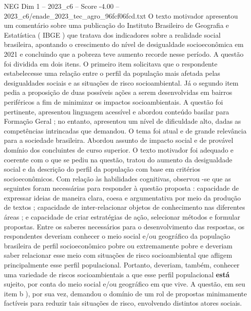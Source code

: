 \begin{textsample}{NEG Dim 1 – 2023\_c6 – Score -4.00 – 2023\_c6/enade\_2023\_tec\_agro\_96fcf06fcd.txt}
O texto motivador apresentou um comentário sobre uma publicação do Instituto Brasileiro de Geografia e Estatística ( IBGE ) que tratava dos indicadores sobre a realidade social brasileira, apontando o crescimento do nível de desigualdade socioeconômica em 2021 e concluindo que a pobreza teve aumento recorde nesse período.
A questão foi dividida em dois itens.
O primeiro item solicitava que o respondente estabelecesse uma relação entre o perfil da população mais afetada pelas desigualdades sociais e as situações de risco socioambiental.
Já o segundo item pedia a proposição de duas possíveis ações a serem desenvolvidas em bairros periféricos a fim de minimizar os impactos socioambientais.
A questão foi pertinente, apresentou linguagem acessível e abordou conteúdo basilar para Formação Geral ; no entanto, apresentou um nível de dificuldade alto, dadas as competências intrincadas que demandou.
O tema foi atual e de grande relevância para a sociedade brasileira.
Abordou assunto de impacto social e de provável domínio dos concluintes de curso superior.
O texto motivador foi adequado e coerente com o que se pediu na questão, tratou do aumento da desigualdade social e da descrição do perfil da população com base em critérios socioeconômicos.
Com relação às habilidades cognitivas, observou -se que as seguintes foram necessárias para responder à questão proposta : capacidade de expressar ideias de maneira clara, coesa e argumentativa por meio da produção de textos ; capacidade de inter-relacionar objetos de conhecimento nas diferentes áreas ; e capacidade de criar estratégias de ação, selecionar métodos e formular propostas.
Entre os saberes necessários para o desenvolvimento das respostas, os respondentes deveriam conhecer o meio social e/ou geográfico da população brasileira de perfil socioeconômico pobre ou extremamente pobre e deveriam saber relacionar esse meio com situações de risco socioambiental que afligem principalmente esse perfil populacional.
Portanto, deveriam, também, conhecer uma variedade de riscos socioambientais a que esse perfil populacional \textbf{está} sujeito, por conta do meio social e/ou geográfico em que vive.
A questão, em seu item b ), por sua vez, demandou o domínio de um rol de propostas minimamente factíveis para reduzir tais situações de risco, envolvendo distintos atores sociais.

\end{textsample}
